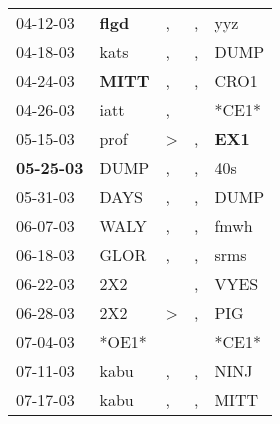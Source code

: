\begin{supertabular}{p{0.07\textwidth}p{0.06\textwidth}p{0.02\textwidth}p{0.02\textwidth}p{0.06\textwidth}}
          04-12-03\textsuperscript{} &  \textbf{flgd\textsuperscript{}} &                , &                , &            yyz\textsuperscript{} \\
          04-18-03\textsuperscript{} &           kats\textsuperscript{} &                , &                , &           DUMP\textsuperscript{} \\
          04-24-03\textsuperscript{} &  \textbf{MITT\textsuperscript{}} &                , &                , &           CRO1\textsuperscript{} \\
          04-26-03\textsuperscript{} &           iatt\textsuperscript{} &                , &                  &                            *CE1* \\
          05-15-03\textsuperscript{} &           prof\textsuperscript{} &     \textgreater &                , &   \textbf{EX1\textsuperscript{}} \\
 \textbf{05-25-03\textsuperscript{}} &           DUMP\textsuperscript{} &                , &                , &            40s\textsuperscript{} \\
          05-31-03\textsuperscript{} &           DAYS\textsuperscript{} &                , &                , &           DUMP\textsuperscript{} \\
          06-07-03\textsuperscript{} &           WALY\textsuperscript{} &                , &                , &           fmwh\textsuperscript{} \\
          06-18-03\textsuperscript{} &           GLOR\textsuperscript{} &                , &                , &           srms\textsuperscript{} \\
          06-22-03\textsuperscript{} &            2X2\textsuperscript{} &                  &                , &           VYES\textsuperscript{} \\
          06-28-03\textsuperscript{} &            2X2\textsuperscript{} &     \textgreater &                , &            PIG\textsuperscript{} \\
          07-04-03\textsuperscript{} &                            *OE1* &                  &                  &                            *CE1* \\
          07-11-03\textsuperscript{} &           kabu\textsuperscript{} &                , &                , &           NINJ\textsuperscript{} \\
          07-17-03\textsuperscript{} &           kabu\textsuperscript{} &                , &                , &           MITT\textsuperscript{} \\

\end{supertabular}

